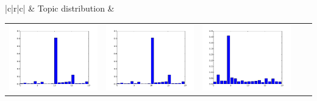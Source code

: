 \documentclass[twoside,11pt]{article}
\begin{document}
\begin{table}[t]
\begin{center}
{\begin{tabular}{|c|r|c|}
& Topic distribution &
\begin{tabular}{ccccc}
\includegraphics[width=\barw\textwidth]{visualize_dist_paMedLDAgibbs_0/0_0} &
\includegraphics[width=\barw\textwidth]{visualize_dist_paMedLDAgibbs_0/0_0}
&
\includegraphics[width=\barw\textwidth]{visualize_dist_paMedLDAgibbs_0/0_1} &

\end{tabular}
\end{tabular}}
\end{center}
\end{table}
\end{document}
